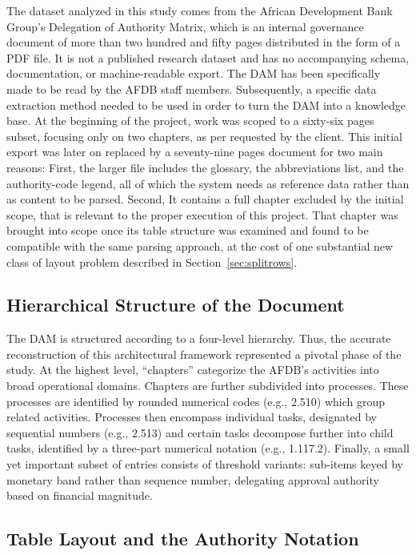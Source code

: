 The dataset analyzed in this study comes from the African Development Bank Group’s Delegation of Authority Matrix, which is an internal governance document of more than two hundred and fifty pages distributed in the form of a PDF file. It is not a published research dataset and has no accompanying schema, documentation, or machine-readable export. The DAM has been specifically made to be read by the AFDB staff members. Subsequently, a specific data extraction method needed to be used in order to turn the DAM into a knowledge base. 
At the beginning of the project, work was scoped to a sixty-six pages subset, focusing only on two chapters, as per requested by the client. This initial export was later on replaced by a seventy-nine pages document for two main reasons:
First, the larger file includes the glossary, the abbreviations list, and the authority-code legend, all of which the system needs as reference data rather than as content to be parsed. Second, It contains a full chapter excluded by the initial scope, that is relevant to the proper execution of this project. That chapter was brought into scope once its table structure was examined and found to be compatible with the same parsing approach, at the cost of one substantial new class of layout problem described in Section~\ref{sec:splitrows}.

\subsection{Hierarchical Structure of the Document}

The DAM is structured according to a four-level hierarchy. Thus, the accurate reconstruction of this architectural framework represented a pivotal phase of the study.
At the highest level, “chapters” categorize the AFDB’s activities into broad operational domains. Chapters are further subdivided into processes. These processes are identified by rounded numerical codes (e.g., 2.510) which group related activities. Processes then encompass individual tasks, designated by sequential numbers (e.g., 2.513) and certain tasks decompose further into child tasks, identified by a three-part numerical notation (e.g., 1.117.2). Finally, a small yet important subset of entries consists of threshold variants: sub-items keyed by monetary band rather than sequence number, delegating approval authority based on financial magnitude.

\subsection{Table Layout and the Authority Notation}

